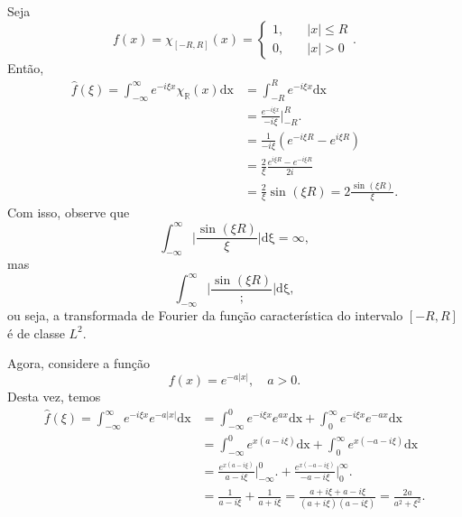 \documentclass[../pde_notes.tex]{subfiles}
\begin{document}
\begin{example}
	Seja
	\[
		f(x) = \chi_{[-R, R]}(x) = \left\{\begin{array}{ll}
			1, & \quad |x|\leq R \\
			0, & \quad |x| > 0
		\end{array}\right..
	\]
	Então,
	\begin{align*}
		\hat{f}(\xi ) = \int_{-\infty}^{\infty}e^{-i\xi x}\chi_{\mathbb{R}}(x) \mathrm{dx} & = \int_{-R}^{R}e^{-i\xi x} \mathrm{dx}                              \\
		                                                                                   & = \frac{e^{-i\xi x}}{-i\xi }\biggl|_{-R}^{R}\biggr.                 \\
		                                                                                   & = \frac{1}{-i\xi }(e^{-i\xi R}-e^{i\xi R})                          \\
		                                                                                   & = \frac{2}{\xi }\frac{e^{i\xi R}-e^{-i\xi R}}{2i}                   \\
		                                                                                   & = \frac{2}{\xi }\sin^{}{(\xi R)} = 2 \frac{\sin^{}{(\xi R)}}{\xi }.
	\end{align*}
	Com isso, observe que
	\[
		\int_{-\infty}^{\infty}\biggl\vert \frac{\sin^{}{(\xi R)}}{\xi } \biggr\vert \mathrm{d\xi } = \infty,
	\]
	mas
	\[
		\int_{-\infty}^{\infty}\biggl\vert \frac{\sin^{}{(\xi R)}}{;} \biggr\vert \mathrm{d\xi },
	\]
	ou seja, a transformada de Fourier da função característica do intervalo \([-R, R]\) é de classe \(L^{2}\).
\end{example}
\begin{example}
	Agora, considere a função
	\[
		f(x) = e^{-a |x|}, \quad a > 0.
	\]
	Desta vez, temos
	\begin{align*}
		\hat{f}(\xi ) = \int_{-\infty}^{\infty}e^{-i\xi x}e^{-a|x|} \mathrm{dx} & = \int_{-\infty}^{0}e^{-i\xi x}e^{ax} \mathrm{dx} + \int_{0}^{\infty}e^{-i\xi x}e^{-ax} \mathrm{dx}                        \\
		                                                                        & = \int_{-\infty}^{0}e^{x(a-i\xi )} \mathrm{dx} + \int_{0}^{\infty}e^{x(-a-i\xi )} \mathrm{dx}                              \\
		                                                                        & = \frac{e^{x(a-i\xi )}}{a-i\xi }\biggl|_{-\infty}^{0}\biggr. + \frac{e^{x(-a-i\xi )}}{-a-i\xi }\biggl|_{0}^{\infty}\biggr. \\
		                                                                        & = \frac{1}{a-i\xi }+\frac{1}{a+i\xi } = \frac{a+i\xi + a - i\xi }{(a+i\xi )(a-i\xi )} = \frac{2a}{a^{2}+\xi^{2}}.
	\end{align*}
\end{example}
\end{document}
